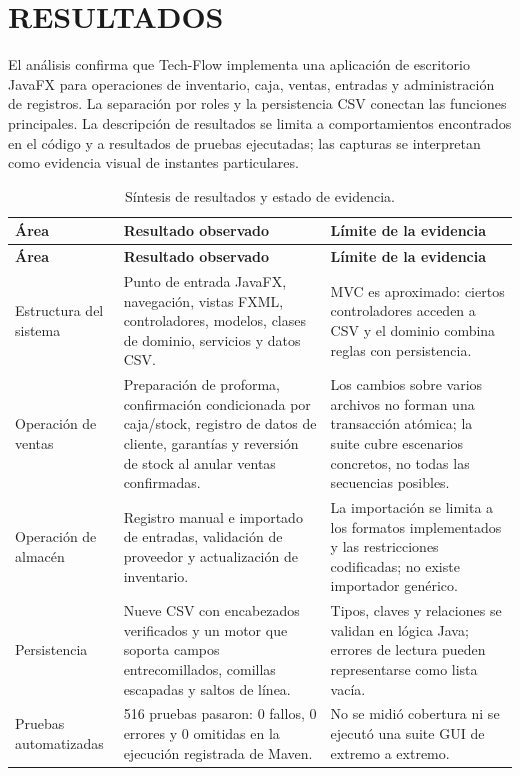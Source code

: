 \section*{RESULTADOS}

El análisis confirma que Tech-Flow implementa una aplicación de escritorio JavaFX para operaciones de inventario, caja, ventas, entradas y administración de registros. La separación por roles y la persistencia CSV conectan las funciones principales. La descripción de resultados se limita a comportamientos encontrados en el código y a resultados de pruebas ejecutadas; las capturas se interpretan como evidencia visual de instantes particulares.

\begin{longtable}{|p{3.1cm}|p{5.3cm}|p{4.8cm}|}
\caption{Síntesis de resultados y estado de evidencia.}
\label{tab:resultados}\\
\hline
\textbf{Área} & \textbf{Resultado observado} & \textbf{Límite de la evidencia}\\
\hline
\endfirsthead
\hline
\textbf{Área} & \textbf{Resultado observado} & \textbf{Límite de la evidencia}\\
\hline
\endhead
Estructura del sistema & Punto de entrada JavaFX, navegación, vistas FXML, controladores, modelos, clases de dominio, servicios y datos CSV. & MVC es aproximado: ciertos controladores acceden a CSV y el dominio combina reglas con persistencia.\\
\hline
Operación de ventas & Preparación de proforma, confirmación condicionada por caja/stock, registro de datos de cliente, garantías y reversión de stock al anular ventas confirmadas. & Los cambios sobre varios archivos no forman una transacción atómica; la suite cubre escenarios concretos, no todas las secuencias posibles.\\
\hline
Operación de almacén & Registro manual e importado de entradas, validación de proveedor y actualización de inventario. & La importación se limita a los formatos implementados y las restricciones codificadas; no existe importador genérico.\\
\hline
Persistencia & Nueve CSV con encabezados verificados y un motor que soporta campos entrecomillados, comillas escapadas y saltos de línea. & Tipos, claves y relaciones se validan en lógica Java; errores de lectura pueden representarse como lista vacía.\\
\hline
Pruebas automatizadas & 516 pruebas pasaron: 0 fallos, 0 errores y 0 omitidas en la ejecución registrada de Maven. & No se midió cobertura ni se ejecutó una suite GUI de extremo a extremo.\\

\end{longtable}

